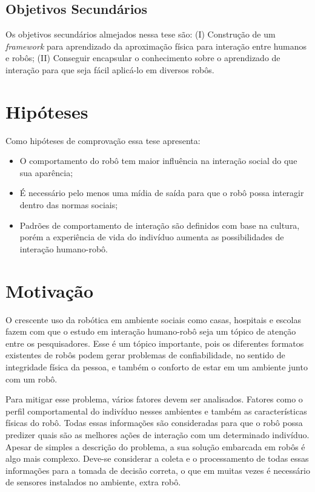 \subsection{Objetivos Secundários}
Os objetivos secundários almejados nessa tese são: (I) Construção de um \emph{framework} para aprendizado da aproximação física para interação entre humanos e robôs; (II) Conseguir encapsular o conhecimento sobre o aprendizado de interação para que seja fácil aplicá-lo em diversos robôs.

\section{Hipóteses}
Como hipóteses de comprovação essa tese apresenta:

\begin{itemize}
    \item O comportamento do robô tem maior influência na interação social do que sua aparência;
    \item É necessário pelo menos uma mídia de saída para que o robô possa interagir dentro das normas sociais;
    \item Padrões de comportamento de interação são definidos com base na cultura, porém a experiência de vida do indivíduo aumenta as possibilidades de interação humano-robô.
\end{itemize}

\section{Motivação}
O crescente uso da robótica em ambiente sociais como casas, hospitais e escolas fazem com que o estudo em interação humano-robô seja um tópico de atenção entre os pesquisadores. Esse é um tópico importante, pois os diferentes formatos existentes de robôs podem gerar problemas de confiabilidade, no sentido de integridade física da pessoa, e também o conforto de estar em um ambiente junto com um robô.

Para mitigar esse problema, vários fatores devem ser analisados. Fatores como o perfil comportamental do indivíduo nesses ambientes e também as características físicas do robô. Todas essas informações são consideradas para que o robô possa predizer quais são as melhores ações de interação com um determinado indivíduo. Apesar de simples a descrição do problema, a sua solução embarcada em robôs é algo mais complexo. Deve-se considerar a coleta e o processamento de todas essas informações para a tomada de decisão correta, o que em muitas vezes é necessário de sensores instalados no ambiente, extra robô.

